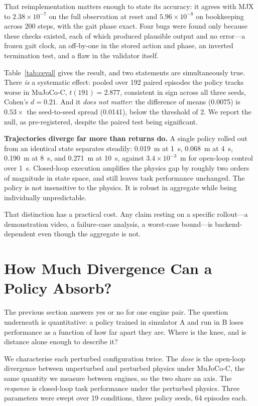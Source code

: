 \documentclass[conference]{IEEEtran}
\begin{document}
That reimplementation matters enough to state its accuracy: it agrees
with MJX to $2.38\times10^{-7}$ on the full observation at reset and
$5.96\times10^{-8}$ on bookkeeping across 200 steps, with the gait phase
exact. Four bugs were found only because these checks existed, each of
which produced plausible output and no error---a frozen gait clock, an
off-by-one in the stored action and phase, an inverted termination test,
and a flaw in the validator itself.

Table~\ref{tab:ceval} gives the result, and two statements are
simultaneously true. There \emph{is} a systematic effect: pooled over 192
paired episodes the policy tracks worse in MuJoCo-C, $t(191)=2.877$,
consistent in sign across all three seeds, Cohen's $d=0.21$. And it
\emph{does not matter}: the difference of means (0.0075) is $0.53\times$
the seed-to-seed spread (0.0141), below the threshold of 2. We report the
null, as pre-registered, despite the paired test being significant.

\textbf{Trajectories diverge far more than returns do.} A single policy
rolled out from an identical state separates steadily: 0.019~m at 1~s,
0.068~m at 4~s, 0.190~m at 8~s, and 0.271~m at 10~s, against
$3.4\times10^{-3}$~m for open-loop control over 1~s. Closed-loop execution
amplifies the physics gap by roughly two orders of magnitude in state
space, and still leaves task performance unchanged. The policy is not
insensitive to the physics. It is robust in aggregate while being
individually unpredictable.

That distinction has a practical cost. Any claim resting on a specific
rollout---a demonstration video, a failure-case analysis, a worst-case
bound---is backend-dependent even though the aggregate is not.

\section{How Much Divergence Can a Policy Absorb?}
\label{sec:dose}

The previous section answers yes or no for one engine pair. The question
underneath is quantitative: a policy trained in simulator A and run in B
loses performance as a function of how far apart they are. Where is the
knee, and is distance alone enough to describe it?

We characterise each perturbed configuration twice. The \emph{dose} is
the open-loop divergence between unperturbed and perturbed physics under
MuJoCo-C, the same quantity we measure between engines, so the two share
an axis. The \emph{response} is closed-loop task performance under the
perturbed physics. Three parameters were swept over 19 conditions, three
policy seeds, 64 episodes each.
\end{document}
